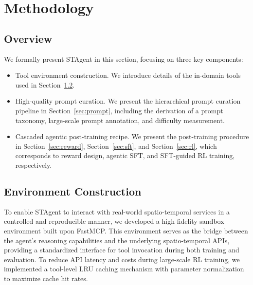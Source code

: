 \documentclass{article} %
\newcommand{\model}{STAgent\xspace}
\begin{document}
\section{Methodology}
\subsection{Overview}
We formally present \model in this section, focusing on three key components:
\begin{itemize}
\item Tool environment construction. We introduce details of the in-domain tools used in Section~\ref{sec:env}.
\item High-quality prompt curation. We present the hierarchical prompt curation pipeline in Section~\ref{sec:prompt}, including the derivation of a prompt taxonomy, large-scale prompt annotation, and difficulty measurement.
\item Cascaded agentic post-training recipe. We present the post-training procedure in Section~\ref{sec:reward}, Section~\ref{sec:sft}, and Section~\ref{sec:rl}, which corresponds to reward design, agentic SFT, and SFT-guided RL training, respectively.
\end{itemize}


\subsection{Environment Construction} \label{sec:env}
To enable \model to interact with real-world spatio-temporal services in a controlled and reproducible manner, we developed a high-fidelity sandbox environment built upon FastMCP. This environment serves as the bridge between the agent's reasoning capabilities and the underlying spatio-temporal APIs, providing a standardized interface for tool invocation during both training and evaluation. To reduce API latency and costs during large-scale RL training, we implemented a tool-level LRU caching mechanism with parameter normalization to maximize cache hit rates.
\end{document}
